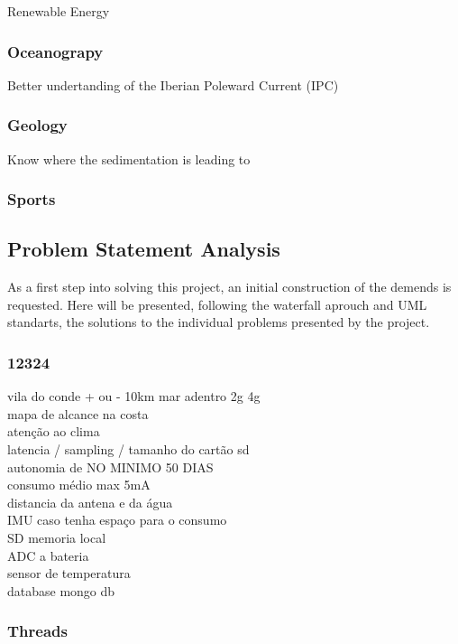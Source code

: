 Renewable Energy 

\subsubsection{Oceanograpy}
Better undertanding of the Iberian Poleward Current (IPC)

\subsubsection{Geology}

Know where the sedimentation is leading to
\subsubsection{Sports}

\subsection{Problem Statement Analysis}
As a first step into solving this project, an initial construction of the
demends is requested. Here will be presented, following the waterfall aprouch
and UML standarts, the solutions to the individual problems presented by the project.

\subsubsection{12324}

vila do conde + ou - 10km mar adentro 2g 4g\\
mapa de alcance na costa\\
atenção ao clima \\
latencia / sampling / tamanho do cartão sd\\ 
autonomia de NO MINIMO 50 DIAS \\
consumo médio max 5mA \\
distancia da antena e da água \\
IMU caso tenha espaço para o consumo \\
SD memoria local \\
ADC a bateria \\
sensor de temperatura \\
database mongo db \\

\subsubsection{Threads}

